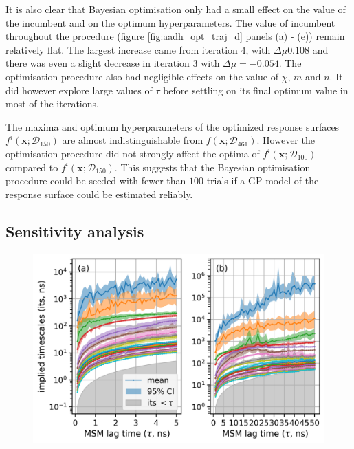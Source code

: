 It is also clear that Bayesian optimisation only had a small effect on the value of the incumbent and on the optimum hyperparameters.  The value of incumbent throughout the procedure (figure \ref{fig:aadh_opt_traj_d} panels (a) - (e)) remain relatively flat. The largest increase came from iteration $4$, with $\Delta \mu 0.108$ and there was even a slight decrease in iteration $3$ with $\Delta \mu = -0.054$. The optimisation procedure also had negligible effects on the value of $\chi$, $m$ and $n$. It did however explore large values of  $\tau$ before settling on its final optimum value in most of the iterations.

The maxima and optimum hyperparameters of the optimized response surfaces $f^{i}(\mathbf{x};\mathcal{D}_{150})$ are almost indistinguishable from $f(\mathbf{x};\mathcal{D}_{461})$. However the optimisation procedure did not strongly affect the optima of $f^{i}(\mathbf{x};\mathcal{D}_{100})$ compared to $f^{i}(\mathbf{x};\mathcal{D}_{150})$. This suggests that the Bayesian optimisation procedure could be seeded with fewer than $100$ trials if a GP model of the response surface could be estimated reliably. 

\subsection{Sensitivity analysis}\label{sec:aadh_sens_analysis}

\begin{figure}
    \centering
    \label{fig:aadh_its}
    \includegraphics[width=0.9\linewidth]{chapters/msm_optimization/figures/aadh_implied_timescales.png}
\end{figure}

